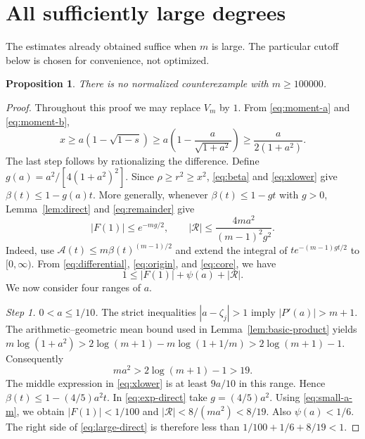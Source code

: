 \documentclass[11pt,reqno]{amsart}
\newtheorem{prop}[thm]{Proposition}
\theoremstyle{definition}
\theoremstyle{remark}
\numberwithin{equation}{section}
\newcommand{\step}[1]{\par\smallskip\noindent\emph{#1}\enspace}
\begin{document}
\section{All sufficiently large degrees}\label{sec:large}

The estimates already obtained suffice when $m$ is large. The particular cutoff below is chosen for convenience, not optimized.

\begin{prop}\label{prop:large}
There is no normalized counterexample with $m\ge100000$.
\end{prop}
\begin{proof}
Throughout this proof we may replace $V_m$ by $1$. From \eqref{eq:moment-a} and \eqref{eq:moment-b},
\begin{equation}\label{eq:xlower}
 x\ge a(1-\sqrt{1-s})
 \ge a\left(1-\frac a{\sqrt{1+a^2}}\right)
 \ge\frac{a}{2(1+a^2)}.
\end{equation}
The last step follows by rationalizing the difference. Define
$g(a)=a^2/[4(1+a^2)^2]$. Since $\rho\ge r^2\ge x^2$, \eqref{eq:beta} and \eqref{eq:xlower} give $\beta(t)\le1-g(a)t$.
More generally, whenever $\beta(t)\le1-gt$ with $g>0$, Lemma~\ref{lem:direct} and \eqref{eq:remainder} give
\begin{equation}\label{eq:exp-direct}
 |F(1)|\le e^{-mg/2},\qquad
 |\mathcal R|\le\frac{4ma^2}{(m-1)^2g^2}.
\end{equation}
Indeed, use $\mathcal A(t)\le m\beta(t)^{(m-1)/2}$ and extend the integral of $te^{-(m-1)gt/2}$ to $[0,\infty)$. From \eqref{eq:differential}, \eqref{eq:origin}, and \eqref{eq:core}, we have
\begin{equation}\label{eq:large-direct}
 1\le |F(1)|+\psi(a)+|\mathcal R|.
\end{equation}
We now consider four ranges of $a$.

\step{Step 1. $0<a\le1/10$.}
The strict inequalities $|a-\zeta_j|>1$ imply $|P'(a)|>m+1$.
The arithmetic--geometric mean bound used in Lemma~\ref{lem:basic-product} yields
$m\log(1+a^2)>2\log(m+1)-m\log(1+1/m)>2\log(m+1)-1$.
Consequently
\begin{equation}\label{eq:small-a-m}
 ma^2>2\log(m+1)-1>19.
\end{equation}
The middle expression in \eqref{eq:xlower} is at least $9a/10$ in this range. Hence $\beta(t)\le1-(4/5)a^2t$. In \eqref{eq:exp-direct} take $g=(4/5)a^2$. Using \eqref{eq:small-a-m}, we obtain $|F(1)|<1/100$ and $|\mathcal R|<8/(ma^2)<8/19$. Also $\psi(a)<1/6$. The right side of \eqref{eq:large-direct} is therefore less than $1/100+1/6+8/19<1$.


\end{proof}
\end{document}
